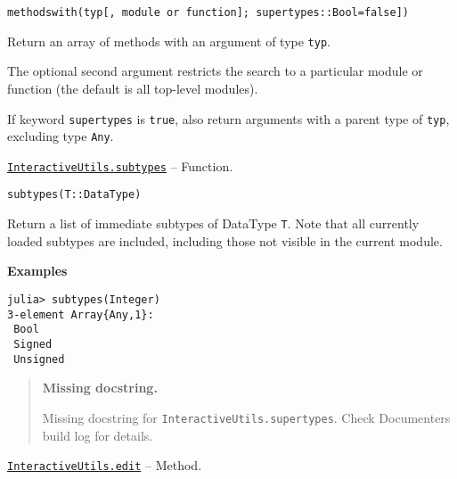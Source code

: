 \begin{adjustwidth}{2em}{0pt}


\begin{verbatim}
methodswith(typ[, module or function]; supertypes::Bool=false])
\end{verbatim}

Return an array of methods with an argument of type \texttt{typ}.

The optional second argument restricts the search to a particular module or function (the default is all top-level modules).

If keyword \texttt{supertypes} is \texttt{true}, also return arguments with a parent type of \texttt{typ}, excluding type \texttt{Any}.



\end{adjustwidth}
\hypertarget{13112219412833772146}{} 
\hyperlink{13112219412833772146}{\texttt{InteractiveUtils.subtypes}}  -- {Function.}

\begin{adjustwidth}{2em}{0pt}


\begin{verbatim}
subtypes(T::DataType)
\end{verbatim}

Return a list of immediate subtypes of DataType \texttt{T}. Note that all currently loaded subtypes are included, including those not visible in the current module.

\textbf{Examples}


\begin{verbatim}
julia> subtypes(Integer)
3-element Array{Any,1}:
 Bool
 Signed
 Unsigned
\end{verbatim}



\end{adjustwidth}

\begin{quote}
\textbf{Missing docstring.}

Missing docstring for \texttt{InteractiveUtils.supertypes}. Check Documenter{\textquotesingle}s build log for details.

\end{quote}

\hypertarget{10268751953828531961}{} 
\hyperlink{10268751953828531961}{\texttt{InteractiveUtils.edit}}  -- {Method.}


